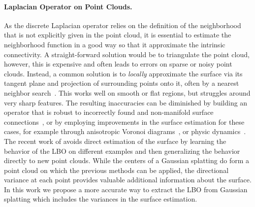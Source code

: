 \paragraph{Laplacian Operator on Point Clouds.} 
As the discrete Laplacian operator relies on the definition of the neighborhood that is not explicitly given in the point cloud, it is essential to estimate the neighborhood function in a good way so that it approximate the intrinsic connectivity.
A straight-forward solution would be to triangulate the point cloud, however, this is expensive and often leads to errors on sparse or noisy point clouds. 
Instead, a common solution is to \emph{locally} approximate the surface via its tangent plane and projection of surrounding points onto it, often by a nearest neighbor search~\cite{Belkin2009ConstructingLO}. 
This works well on smooth or flat regions, but struggles around very sharp features. 
The resulting inaccuracies can be diminished by building an operator that is robust to incorrectly found and non-manifold surface connections~\cite{sharp2020nonmanifold}, or by 
employing improvements in the surface estimation for these cases, for example through anisotropic Voronoi diagrams~\cite{Qin2018anisotropic}, or physic dynamics~\cite{petronetto2013meshfree}.
The recent work of \cite{pang2024neurallaplacianoperator3d} avoids direct estimation of the surface by learning the behavior of the LBO on different examples and then generalizing the behavior directly to new point clouds. 
While the centers of a Gaussian splatting do form a point cloud on which the previous methods can be applied, the directional variance at each point provides valuable additional information about the surface. 
In this work we propose a more accurate way to extract the LBO from Gaussian splatting which includes the variances in the surface estimation. 


